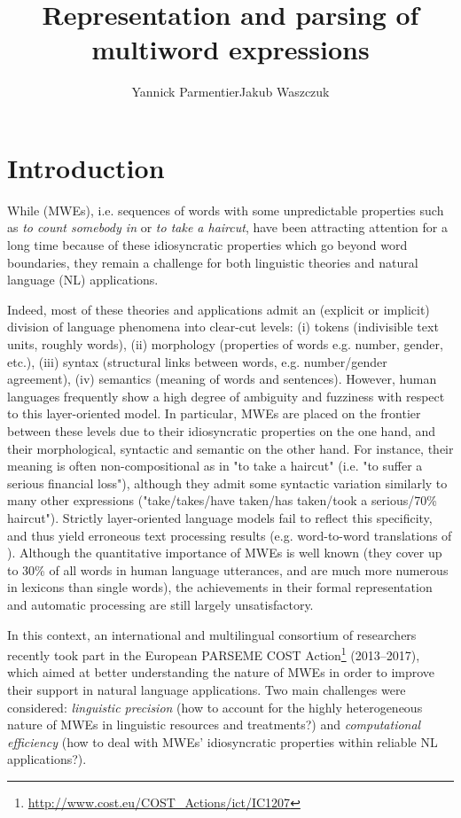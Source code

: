 \documentclass[output=paper]{langsci/langscibook}
\title{Representation and parsing of multiword expressions}
\author{Yannick Parmentier\affiliation{Université d'Orléans}\lastand Jakub Waszczuk\affiliation{Université François Rabelais Tours\\Université d'Orléans}}
\begin{document}
\section{Introduction} 
While  (MWEs), i.e. sequences of words with some
unpredictable properties such as \textit{to count somebody in} or
\textit{to take a haircut}, have been attracting attention for a long
time because of these idiosyncratic properties which go beyond word
boundaries, they remain a challenge for both linguistic theories and
natural language (NL) applications.

Indeed, most of these theories and applications admit an (explicit or
implicit) division of language phenomena into clear-cut levels:
(i) tokens (indivisible text units, roughly words),
(ii) morphology (properties of words e.g. number, gender, etc.),
(iii) syntax (structural links between words, e.g. number/gender agreement),
(iv) semantics (meaning of words and sentences).
However, human languages frequently show a high degree of ambiguity
and fuzziness with respect to this layer-oriented model. In
particular, MWEs are placed on the frontier between these levels due
to their idiosyncratic properties on the one hand, and their
morphological, syntactic and semantic  on the other
hand. For instance, their meaning is often non-compositional as in "to
take a haircut" (i.e. "to suffer a serious financial loss"), although
they admit some syntactic variation similarly to many other
expressions ("take/takes/have taken/has taken/took a serious/70\%
haircut"). Strictly layer-oriented language models fail to reflect
this specificity, and thus yield erroneous text processing results
(e.g. word-to-word translations of ). Although the quantitative
importance of MWEs is well known (they cover up to 30\% of all words
in human language utterances, and are much more numerous in lexicons
than single words), the achievements in their formal representation
and automatic processing are still largely unsatisfactory.

In this context, an international and multilingual consortium of
researchers recently took part in the European PARSEME COST
Action\footnote{\url{http://www.cost.eu/COST_Actions/ict/IC1207}}
(2013--2017), which aimed at better understanding the nature of MWEs in
order to improve their support in natural language applications. Two
main challenges were considered: \emph{linguistic precision} (how to
account for the highly heterogeneous nature of MWEs in linguistic
resources and treatments?) and \emph{computational efficiency} (how to
deal with MWEs' idiosyncratic properties within reliable NL
applications?).
\end{document}
